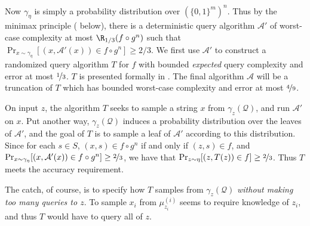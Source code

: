 \documentclass{toc}
\newcommand{\dr}{\nicefrac}
\newcommand{\clQ}{\mathcal{Q}}
\begin{document}
Now $\gamma_\eta$ is simply a probability distribution over $(\{0,1\}^m)^n$. Thus by the minimax principle ( below), there is a deterministic query algorithm $\mathcal{A}'$ of worst-case complexity at most 
$\R_{1/3} (f \circ g^n)$ such that $\Pr_{x \sim \gamma_\eta}[(x,\mathcal{A}'(x)) \in f \circ g^n] \geq 2/3$. We first use $\mathcal{A}'$ to construct a randomized query algorithm $T$ for $f$ with bounded \emph{expected} 
query complexity and error at most $\dr13$.  $T$ is presented formally in . The final algorithm $\mathcal{A}$ will be a truncation of $T$ which has bounded worst-case complexity and error at 
most $\dr49$.

On input $z$, the algorithm $T$ seeks to sample a string $x$ from $\gamma_z(\clQ)$, and run $\mathcal{A'}$ on $x$.  Put another way, $\gamma_z(\clQ)$ induces a probability distribution over the 
leaves of $\mathcal{A}'$, and the goal of $T$ is to sample a leaf of $\mathcal{A}'$ according to this distribution.
Since for each $s \in S$, $(x,s) \in f \circ g^n$ if and only if $(z,s) \in f$, and 
$\Pr_{x \sim \gamma_\eta}[(x,\mathcal{A}'(x)) \in f \circ g^n] \geq \dr23$, we have that $\Pr_{z \sim \eta}[(z,T(z)) \in f ] \geq \dr23$. Thus $T$ meets the accuracy requirement.

The catch, of course, is to specify how $T$ samples from $\gamma_z(\clQ)$ \emph{without making too many queries to $z$}.  To sample $x_i$ from $\mu_{z_i}^{(i)}$ seems to require knowledge of $z_i$, and 
thus $T$ would have to query all of $z$.
\end{document}
